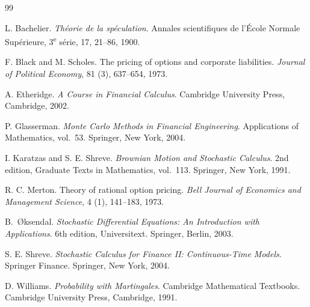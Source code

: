 \documentclass[11pt,a4paper,oneside]{report}
\theoremstyle{plain}
\theoremstyle{definition}
\theoremstyle{remark}
\newcommand{\1}{\mathbf{1}}
\begin{document}
\begin{thebibliography}{99}

L. Bachelier.
\emph{Théorie de la spéculation}.
Annales scientifiques de l'École Normale Supérieure, 3\textsuperscript{e}
série, 17, 21--86, 1900.

F. Black and M. Scholes.
The pricing of options and corporate liabilities.
\emph{Journal of Political Economy}, 81 (3), 637--654, 1973.

A. Etheridge.
\emph{A Course in Financial Calculus}.
Cambridge University Press, Cambridge, 2002.

P. Glasserman.
\emph{Monte Carlo Methods in Financial Engineering}.
Applications of Mathematics, vol.~53. Springer, New York, 2004.

I. Karatzas and S. E. Shreve.
\emph{Brownian Motion and Stochastic Calculus}.
2nd edition, Graduate Texts in Mathematics, vol.~113.
Springer, New York, 1991.

R. C. Merton.
Theory of rational option pricing.
\emph{Bell Journal of Economics and Management Science}, 4 (1),
141--183, 1973.

B.~\O{}ksendal.
\emph{Stochastic Differential Equations: An Introduction with
Applications}.
6th edition, Universitext. Springer, Berlin, 2003.

S. E. Shreve.
\emph{Stochastic Calculus for Finance II: Continuous-Time Models}.
Springer Finance. Springer, New York, 2004.

D. Williams.
\emph{Probability with Martingales}.
Cambridge Mathematical Textbooks. Cambridge University Press,
Cambridge, 1991.

\end{thebibliography}
\end{document}
